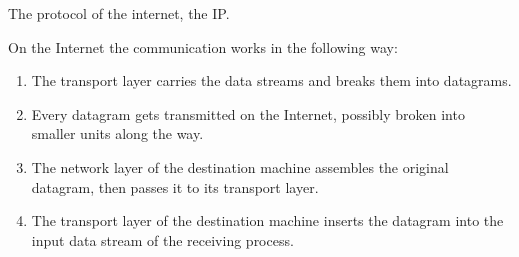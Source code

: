 \documentclass[margin=0px]{article}
\begin{document}
\begin{description}
        The protocol of the internet, the IP.

        On the Internet the communication works in the following way:
        \begin{enumerate}
            \item The transport layer carries the data streams and breaks them into datagrams.
            \item Every datagram gets transmitted on the Internet, possibly broken into smaller units along the way.
            \item The network layer of the destination machine assembles the original datagram, then passes it to its transport layer.
            \item The transport layer of the destination machine inserts the datagram into the input data stream of the receiving process.
        \end{enumerate}


\end{description}
\end{document}
